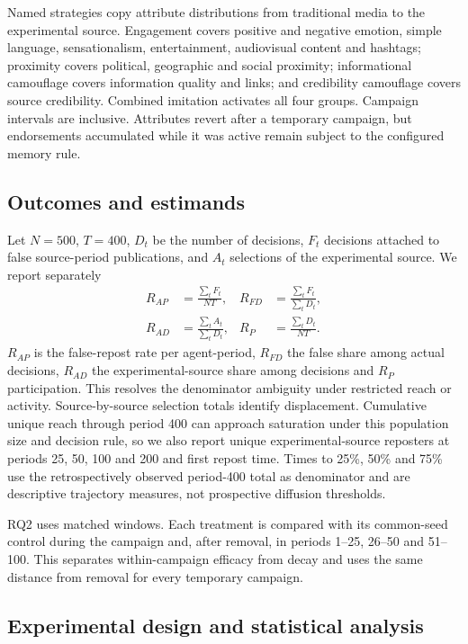 Named strategies copy attribute distributions from traditional media to the experimental source. Engagement covers positive and negative emotion, simple language, sensationalism, entertainment, audiovisual content and hashtags; proximity covers political, geographic and social proximity; informational camouflage covers information quality and links; and credibility camouflage covers source credibility. Combined imitation activates all four groups. Campaign intervals are inclusive. Attributes revert after a temporary campaign, but endorsements accumulated while it was active remain subject to the configured memory rule.

\subsection{Outcomes and estimands}

Let $N=500$, $T=400$, $D_t$ be the number of decisions, $F_t$ decisions attached to false source-period publications, and $A_t$ selections of the experimental source. We report separately
\begin{align}
R_{AP}&=\frac{\sum_{t}F_t}{NT}, &
R_{FD}&=\frac{\sum_{t}F_t}{\sum_{t}D_t},\\
R_{AD}&=\frac{\sum_{t}A_t}{\sum_{t}D_t}, &
R_P&=\frac{\sum_{t}D_t}{NT}.
\end{align}
$R_{AP}$ is the false-repost rate per agent-period, $R_{FD}$ the false share among actual decisions, $R_{AD}$ the experimental-source share among decisions and $R_P$ participation. This resolves the denominator ambiguity under restricted reach or activity. Source-by-source selection totals identify displacement. Cumulative unique reach through period 400 can approach saturation under this population size and decision rule, so we also report unique experimental-source reposters at periods 25, 50, 100 and 200 and first repost time. Times to 25\%, 50\% and 75\% use the retrospectively observed period-400 total as denominator and are descriptive trajectory measures, not prospective diffusion thresholds.

RQ2 uses matched windows. Each treatment is compared with its common-seed control during the campaign and, after removal, in periods 1--25, 26--50 and 51--100. This separates within-campaign efficacy from decay and uses the same distance from removal for every temporary campaign.

\subsection{Experimental design and statistical analysis}

